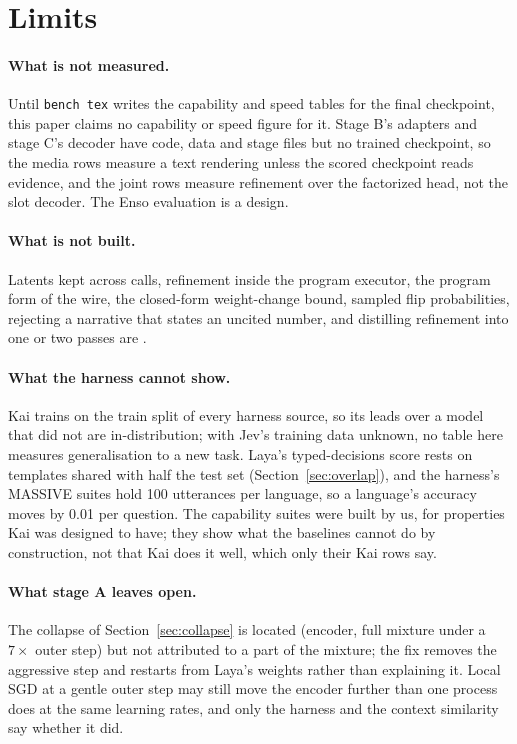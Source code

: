 \section{Limits}
\label{sec:limits}

\paragraph{What is not measured.}
Until \texttt{bench tex} writes the capability and speed tables for the final
checkpoint, this paper claims no capability or speed figure for it.
Stage B's adapters and stage C's decoder have code, data and stage files but no
trained checkpoint, so the media rows measure a text rendering unless the
scored checkpoint reads evidence, and the joint rows measure refinement over
the factorized head, not the slot decoder. The Enso evaluation is a design.

\paragraph{What is not built.}
Latents kept across calls, refinement inside the program executor, the program
form of the wire, the closed-form weight-change bound, sampled flip
probabilities, rejecting a narrative that states an uncited number, and
distilling refinement into one or two passes are \proposed.

\paragraph{What the harness cannot show.}
Kai trains on the train split of every harness source, so its leads over a
model that did not are in-distribution; with Jev's training data unknown, no
table here measures generalisation to a new task. Laya's typed-decisions score
rests on templates shared with half the test set
(Section~\ref{sec:overlap}), and the harness's MASSIVE suites hold 100
utterances per language, so a language's accuracy moves by 0.01 per question.
The capability suites were built by us, for properties Kai was designed to
have; they show what the baselines cannot do by construction, not that Kai
does it well, which only their Kai rows say.

\paragraph{What stage A leaves open.}
The collapse of Section~\ref{sec:collapse} is located (encoder, full mixture
under a $7\times$ outer step) but not attributed to a part of the mixture;
the fix removes the aggressive step and restarts from Laya's weights rather than
explaining it. Local SGD at a gentle outer step may still move the encoder
further than one process does at the same learning rates, and only the harness
and the context similarity say whether it did.


